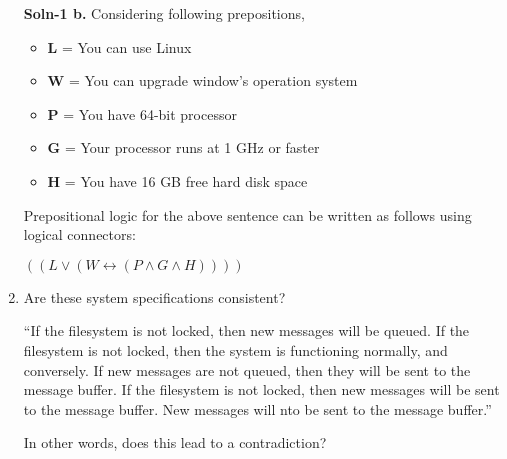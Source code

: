 \documentclass{article}
\begin{document}
\begin{enumerate}
        \textbf{Soln-1 b.} Considering following prepositions, 
        \begin{itemize}
                \item   \textbf{L} = You can use Linux 
                \item   \textbf{W} = You can upgrade window’s operation system
                \item   \textbf{P} = You have 64-bit processor 
                \item 	\textbf{G} = Your processor runs at 1 GHz or faster
                \item 	\textbf{H} = You have 16 GB free hard disk space
        \end{itemize}
        Prepositional logic for the above sentence can be written as follows using logical connectors: 
        \begin{center}
       $((L \vee (W \leftrightarrow (P \wedge G \wedge H))))$
        \end{center}

\item   Are these system specifications consistent? \par
        {\sffamily ``If the filesystem is not locked, then new messages
        will be queued.  If the filesystem is not locked, then the
        system is functioning normally, and conversely.  If new messages
        are not queued, then they will be sent to the message buffer.
        If the filesystem is not locked, then new messages will be sent
        to the message buffer.  New messages will nto be sent to the
        message buffer.''} \par
        In other words, does this lead to a contradiction?



\end{enumerate}
\end{document}
